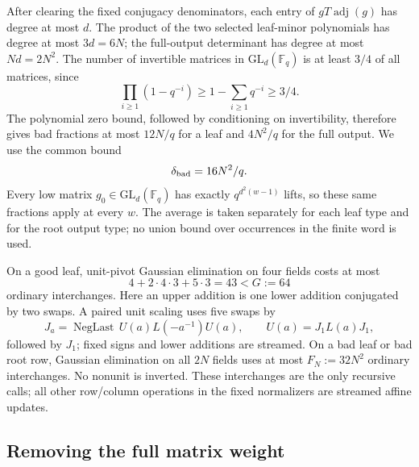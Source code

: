 After clearing the fixed conjugacy denominators, each entry of
$gT\operatorname{adj}(g)$ has degree at most $d$. The product of the
two selected leaf-minor polynomials has degree at most $3d=6N$; the
full-output determinant has degree at most $Nd=2N^2$. The number of
invertible matrices in $\mathrm{GL}_d(\mathbb F_q)$ is at least
$3/4$ of all matrices, since
\[
 \prod_{i\ge1}(1-q^{-i})\ge1-\sum_{i\ge1}q^{-i}\ge3/4.
\]
The polynomial zero bound, followed by conditioning on invertibility,
therefore gives bad fractions at most $12N/q$ for a leaf and $4N^2/q$
for the full output. We use the common bound
\begin{equation}
 \delta_{\rm bad}=16N^2/q.                           \label{eq:movement-3}
\end{equation}
Every low matrix $g_0\in\mathrm{GL}_d(\mathbb F_q)$ has exactly
$q^{d^2(w-1)}$ lifts, so these same fractions apply at every $w$.
The average is taken separately for each leaf type and for the root
output type; no union bound over occurrences in the finite word is used.

On a good leaf, unit-pivot Gaussian elimination on four fields costs at
most
\[
 4+2\cdot4\cdot3+5\cdot3=43< G:=64
\]
ordinary interchanges. Here an upper addition is one lower addition
conjugated by two swaps. A paired unit scaling uses five swaps by
\[
 J_a=\operatorname{NegLast}\,U(a)L(-a^{-1})U(a),\qquad
U(a)=J_1L(a)J_1,
\]
followed by $J_1$; fixed signs and lower additions are streamed.
On a bad leaf or bad root row, Gaussian elimination on all $2N$ fields
uses at most $F_N:=32N^2$ ordinary interchanges. No nonunit is inverted.
These interchanges are the only recursive calls; all other row/column
operations in the fixed normalizers are streamed affine updates.

\subsection{Removing the full matrix weight}

